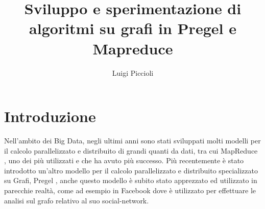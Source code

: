 \documentclass[LaM,binding=0.6cm]{sapthesis}
\title{Sviluppo e sperimentazione di algoritmi su grafi in Pregel e Mapreduce}
\author{Luigi Piccioli}
\begin{document}
\frontmatter

\maketitle


%

\tableofcontents

%
%
%
%
%
%




\mainmatter

\chapter{Introduzione}

Nell'ambito dei Big Data, negli ultimi anni sono stati sviluppati molti modelli per il calcolo parallelizzato e distribuito di grandi quanti da dati, tra cui MapReduce \cite{Dean:2008:MSD:1327452.1327492}, uno dei più utilizzati e che ha avuto più successo. Più recentemente è stato introdotto un'altro modello per il calcolo parallelizzato e distribuito specializzato su Grafi, Pregel \cite{Malewicz:2010:PSL:1807167.1807184}, anche questo modello è subito stato apprezzato ed utilizzato in parecchie realtà, come ad esempio in Facebook dove è utilizzato per effettuare le analisi sul grafo relativo al suo social-network.
\end{document}
